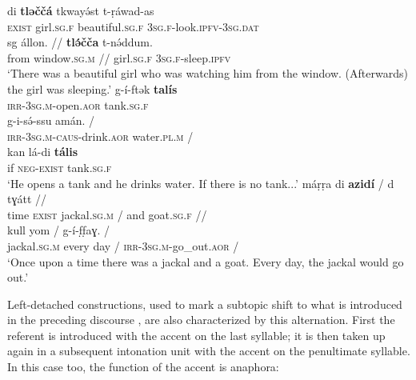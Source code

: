 \documentclass[output=paper]{langsci/langscibook}
\begin{document}
\begin{exe}
\ex\label{5ex:43}
\gll	di	{\textbf{tləččá}}	tkwayə́st	t-ṛáwad-as \\
	{\textsc{exist}}	girl.{\textsc{sg.f}}	beautiful.{\textsc{sg.f}}	{\textsc{3sg.f}}-look.{\textsc{ipfv-3sg.dat}} \\
\glt
\exi{}
\gll	sg	állon.	 //	{\textbf{tlə́čča}}	t-nə́ddum. \\
	from	window.{\textsc{sg.m}}	//	girl.{\textsc{sg.f}}	{\textsc{3sg.f}}-sleep.{\textsc{ipfv}} \\
\glt	`There was a beautiful girl who was watching him from the window. (Afterwards) the girl was sleeping.'
\ex\label{5ex:44}
\gll 	g-í-ftək	{\textbf{talís}} \\
	{\textsc{irr-3sg.m}}-open.{\textsc{aor}}	tank.{\textsc{sg.f}} \\
\glt
\exi{}
\gll	g-i-sə́-ssu	amán.	/ \\
	{\textsc{irr-3sg.m-caus}}-drink.{\textsc{aor}}	water.{\textsc{pl.m}}	/ \\
\glt
\exi{}
\gll	kan	lá-di	{\textbf{tális}} \\
	if	{\textsc{neg-exist}}	tank.{\textsc{sg.f}} \\
\glt	`He opens a tank and he drinks water. If there is no tank...'
\newpage
\ex\label{5ex:45}
\gll	máṛṛa	di	{\textbf{azidí}}	/	d	tɣátt	// \\
	time	{\textsc{exist}}  jackal.{\textsc{sg.m}}	/	and	goat.{\textsc{sg.f}}	// \\
\glt
\exi{}
	kull	yom	/	g-í-f̣f̣aɣ.	/ \\
	jackal.{\textsc{sg.m}}	every	day	/	{\textsc{irr-3sg.m}}-go\_out.{\textsc{aor}}	/ \\
\glt	`Once upon a time there was a jackal and a goat. Every day, the jackal would go out.'
\end{exe}

Left-detached constructions, used to mark a subtopic shift to what is introduced in the preceding discourse \citep[][278]{mettouchi:schiattarella:18}, are also characterized by this alternation. First the referent is introduced with the accent on the last syllable; it is then taken up again in a subsequent intonation unit with the accent on the penultimate syllable. In this case too, the function of the accent is anaphora:
\end{document}
